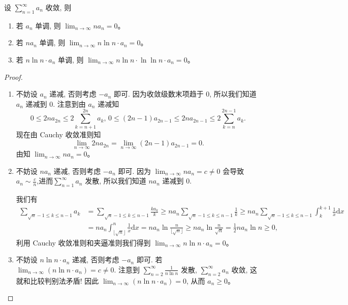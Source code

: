 \documentclass[../../main.tex]{subfiles}
\begin{document}
\begin{proposition}\label{proposition:单调收敛级数的阶}
设 \( \sum_{n = 1}^{\infty} a_n \) 收敛, 则
\begin{enumerate}
\item 若 \( a_n \) 单调, 则 \( \lim_{n \to \infty} n a_n = 0 \)。

\item 若 \( n a_n \) 单调, 则 \( \lim_{n \to \infty} n \ln n \cdot a_n = 0 \)。

\item 若 \( n \ln n \cdot a_n \) 单调, 则 \( \lim_{n \to \infty} n \ln n \cdot \ln \ln n \cdot a_n = 0 \)。
\end{enumerate}
\end{proposition}
\begin{proof}
\begin{enumerate}
\item 不妨设 \( a_n \) 递减, 否则考虑 \( -a_n \) 即可. 因为收敛级数末项趋于 0, 所以我们知道 \( a_n \) 递减到 0. 注意到由 \( a_n \) 递减知
\[
0 \leqslant 2n a_{2n} \leqslant 2 \sum_{k = n + 1}^{2n} a_k, \, 0 \leqslant (2n - 1) a_{2n - 1} \leqslant 2n a_{2n - 1} \leqslant 2 \sum_{k = n}^{2n - 1} a_k.
\]
现在由 Cauchy 收敛准则知
\[
\lim_{n \to \infty} 2n a_{2n} = \lim_{n \to \infty} (2n - 1) a_{2n - 1} = 0.
\]
由知 \( \lim_{n \to \infty} n a_n = 0 \)。

\item 不妨设 \( n a_n \) 递减, 否则考虑 \( -a_n \) 即可. 因为 \( \lim_{n \to \infty} n a_n = c \neq 0 \) 会导致$a_n\sim \frac{c}{n}$,进而\( \sum_{n = 1}^{\infty} a_n \) 发散, 所以我们知道 \( n a_n \) 递减到 0.

我们有
\begin{align*}
\sum_{\sqrt{n} - 1 \leqslant k \leqslant n - 1} a_k &= \sum_{\sqrt{n} - 1 \leqslant k \leqslant n - 1} \frac{k a_k}{k} \geqslant n a_n \sum_{\sqrt{n} - 1 \leqslant k \leqslant n - 1} \frac{1}{k} \geqslant n a_n \sum_{\sqrt{n} - 1 \leqslant k \leqslant n - 1} \int_{k}^{k + 1} \frac{1}{x} \mathrm{d}x \\
&= n a_n \int_{\lfloor \sqrt{n} \rfloor}^{n} \frac{1}{x} \mathrm{d}x = n a_n \ln \frac{n}{\lfloor \sqrt{n} \rfloor} \geqslant n a_n \ln \frac{n}{\sqrt{n}} = \frac{1}{2} n a_n \ln n \geqslant 0,
\end{align*}
利用 Cauchy 收敛准则和夹逼准则我们得到 \( \lim_{n \to \infty} n \ln n \cdot a_n = 0 \)。

\item 不妨设 \( n \ln n \cdot a_n \) 递减, 否则考虑 \( -a_n \) 即可. 若 \( \lim_{n \to \infty} (n \ln n \cdot a_n) = c \neq 0 \). 注意到 \( \sum_{n = 2}^{\infty} \frac{1}{n \ln n} \) 发散, \( \sum_{n = 2}^{\infty} a_n \) 收敛, 这就和比较判别法矛盾! 因此 \( \lim_{n \to \infty} (n \ln n \cdot a_n) = 0 \), 从而 \( a_n \geqslant 0 \)。


\end{enumerate}
\end{proof}
\end{document}
